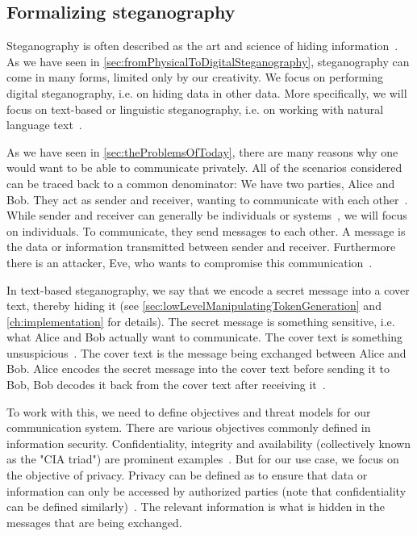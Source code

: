 \subsection{Formalizing steganography}
\label{sec:formalizingSteganography}
Steganography is often described as the art and science of hiding information~\cite{bennettLinguisticSteganographySurvey2004,wuGenerativeTextSteganography2024}. As we have seen in \cref{sec:fromPhysicalToDigitalSteganography}, steganography can come in many forms, limited only by our creativity. We focus on performing digital steganography, i.e. on hiding data in other data. More specifically, we will focus on text-based or linguistic steganography, i.e. on working with natural language text~\cite{zieglerNeuralLinguisticSteganography2019}.

As we have seen in \cref{sec:theProblemsOfToday}, there are many reasons why one would want to be able to communicate privately. All of the scenarios considered can be traced back to a common denominator: We have two parties, Alice and Bob. They act as sender and receiver, wanting to communicate with each other~\cite{wuGenerativeTextSteganography2024}. While sender and receiver can generally be individuals or systems~\cite{bennettLinguisticSteganographySurvey2004}, we will focus on individuals. To communicate, they send messages to each other. A message is the data or information transmitted between sender and receiver. Furthermore there is an attacker, Eve, who wants to compromise this communication~\cite{al-aniOverviewMainFundamentals2010,wuGenerativeTextSteganography2024}.

In text-based steganography, we say that we encode a secret message into a cover text, thereby hiding it (see \cref{sec:lowLevelManipulatingTokenGeneration} and \cref{ch:implementation} for details). The secret message is something sensitive, i.e. what Alice and Bob actually want to communicate. The cover text is something unsuspicious~\cite{al-aniOverviewMainFundamentals2010}. The cover text is the message being exchanged between Alice and Bob. Alice encodes the secret message into the cover text before sending it to Bob, Bob decodes it back from the cover text after receiving it~\cite{al-aniOverviewMainFundamentals2010}.

To work with this, we need to define objectives and threat models for our communication system. There are various objectives commonly defined in information security. Confidentiality, integrity and availability (collectively known as the "CIA triad") are prominent examples~\cite{aliIoTSecurityReview2019,qadirReviewPaperCryptography2019,chowdhuryChatGPTThreatCIA2023}. But for our use case, we focus on the objective of privacy. Privacy can be defined as to ensure that data or information can only be accessed by authorized parties (note that confidentiality can be defined similarly)~\cite{chowdhuryChatGPTThreatCIA2023}. The relevant information is what is hidden in the messages that are being exchanged.

